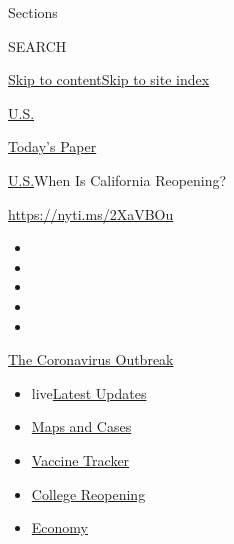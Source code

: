Sections

SEARCH

\protect\hyperlink{site-content}{Skip to
content}\protect\hyperlink{site-index}{Skip to site index}

\href{https://www.nytimes.com/section/us}{U.S.}

\href{https://myaccount.nytimes.com/auth/login?response_type=cookie\&client_id=vi}{}

\href{https://www.nytimes.com/section/todayspaper}{Today's Paper}

\href{/section/us}{U.S.}\textbar{}When Is California Reopening?

\url{https://nyti.ms/2XaVBOu}

\begin{itemize}
\item
\item
\item
\item
\item
\end{itemize}

\href{https://www.nytimes.com/news-event/coronavirus?action=click\&pgtype=Article\&state=default\&region=TOP_BANNER\&context=storylines_menu}{The
Coronavirus Outbreak}

\begin{itemize}
\tightlist
\item
  live\href{https://www.nytimes.com/2020/08/04/world/coronavirus-cases.html?action=click\&pgtype=Article\&state=default\&region=TOP_BANNER\&context=storylines_menu}{Latest
  Updates}
\item
  \href{https://www.nytimes.com/interactive/2020/us/coronavirus-us-cases.html?action=click\&pgtype=Article\&state=default\&region=TOP_BANNER\&context=storylines_menu}{Maps
  and Cases}
\item
  \href{https://www.nytimes.com/interactive/2020/science/coronavirus-vaccine-tracker.html?action=click\&pgtype=Article\&state=default\&region=TOP_BANNER\&context=storylines_menu}{Vaccine
  Tracker}
\item
  \href{https://www.nytimes.com/2020/08/02/us/covid-college-reopening.html?action=click\&pgtype=Article\&state=default\&region=TOP_BANNER\&context=storylines_menu}{College
  Reopening}
\item
  \href{https://www.nytimes.com/live/2020/08/04/business/stock-market-today-coronavirus?action=click\&pgtype=Article\&state=default\&region=TOP_BANNER\&context=storylines_menu}{Economy}
\end{itemize}

